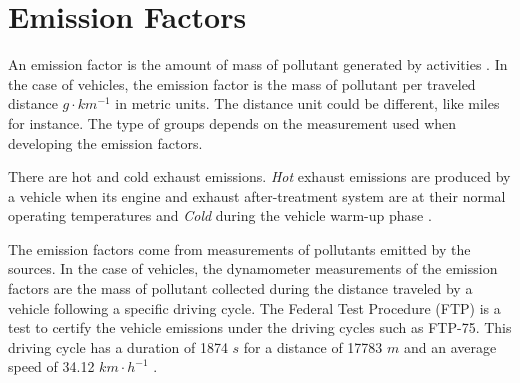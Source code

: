 \documentclass[12pt,graybox,envcountchap,sectrefs]{krantz}
\makeatletter
\newenvironment{Shaded}{\begin{snugshade}}{\end{snugshade}}
\newcommand{\KeywordTok}[1]{\textcolor[rgb]{0.13,0.29,0.53}{\textbf{#1}}}
\newcommand{\DataTypeTok}[1]{\textcolor[rgb]{0.13,0.29,0.53}{#1}}
\newcommand{\StringTok}[1]{\textcolor[rgb]{0.31,0.60,0.02}{#1}}
\newcommand{\CommentTok}[1]{\textcolor[rgb]{0.56,0.35,0.01}{\textit{#1}}}
\newcommand{\OperatorTok}[1]{\textcolor[rgb]{0.81,0.36,0.00}{\textbf{#1}}}
\newcommand{\NormalTok}[1]{#1}
\newenvironment{kframe}{%
\medskip{}
\setlength{\fboxsep}{.8em}
 \def\at@end@of@kframe{}%
 \ifinner\ifhmode%
  \def\at@end@of@kframe{\end{minipage}}%
  \begin{minipage}{\columnwidth}%
 \fi\fi%
 \def\FrameCommand##1{\hskip\@totalleftmargin \hskip-\fboxsep
 \colorbox{shadecolor}{##1}\hskip-\fboxsep
     \hskip-\linewidth \hskip-\@totalleftmargin \hskip\columnwidth}%
 \MakeFramed {\advance\hsize-\width
   \@totalleftmargin\z@ \linewidth\hsize
   \@setminipage}}%
 {\par\unskip\endMakeFramed%
 \at@end@of@kframe}
\renewenvironment{Shaded}{\begin{kframe}}{\end{kframe}}
\theoremstyle{definition}
\theoremstyle{definition}
\theoremstyle{definition}
\theoremstyle{remark}
\makeatother
\begin{document}
\begin{Shaded}
\end{Shaded}

\chapter{Emission Factors}\label{ef}

An emission factor is the amount of mass of pollutant generated by
activities \citep{pulles2010art}. In the case of vehicles, the emission
factor is the mass of pollutant per traveled distance
\(g \cdot km^{-1}\) in metric units. The distance unit could be
different, like miles for instance. The type of groups depends on the
measurement used when developing the emission factors.

There are hot and cold exhaust emissions. \emph{Hot} exhaust emissions
are produced by a vehicle when its engine and exhaust after-treatment
system are at their normal operating temperatures and \emph{Cold} during
the vehicle warm-up phase \citep{trlef}.

The emission factors come from measurements of pollutants emitted by the
sources. In the case of vehicles, the dynamometer measurements of the
emission factors are the mass of pollutant collected during the distance
traveled by a vehicle following a specific driving cycle. The Federal
Test Procedure (FTP) is a test to certify the vehicle emissions under
the driving cycles such as FTP-75. This driving cycle has a duration of
1874 \(s\) for a distance of 17783 \(m\) and an average speed of 34.12
\(km \cdot h^{-1}\) \citep{tim}.
\end{document}
